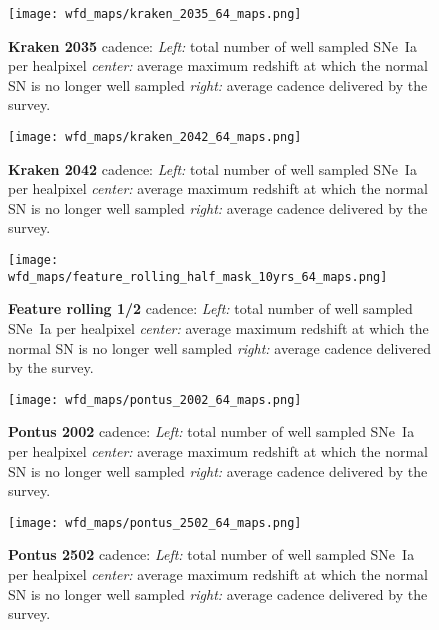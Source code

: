 \begin{figure}[!htbp]
  \begin{center}
    \texttt{[image: wfd\_maps/kraken\_2035\_64\_maps.png]}
    \caption{{\bf Kraken 2035} cadence: {\em Left:} total number of well
      sampled SNe~Ia per healpixel {\em center:} average maximum
      redshift at which the normal SN is no longer well sampled {\em
        right:} average cadence delivered by the survey.}
  \end{center}
  \label{fig:kraken_2035}
\end{figure}

\begin{figure}[!htbp]
  \begin{center}
    \texttt{[image: wfd\_maps/kraken\_2042\_64\_maps.png]}
    \caption{{\bf Kraken 2042} cadence: {\em Left:} total number of well
      sampled SNe~Ia per healpixel {\em center:} average maximum
      redshift at which the normal SN is no longer well sampled {\em
        right:} average cadence delivered by the survey.}
    \label{fig:kraken_2042}
  \end{center}
\end{figure}

\begin{figure}[!htbp]
  \begin{center}
    \texttt{[image: wfd\_maps/feature\_rolling\_half\_mask\_10yrs\_64\_maps.png]}
    \caption{{\bf Feature rolling 1/2} cadence: {\em Left:} total number of well
      sampled SNe~Ia per healpixel {\em center:} average maximum
      redshift at which the normal SN is no longer well sampled {\em
        right:} average cadence delivered by the survey.}
    \label{fig:feature_rolling_half_mask}
  \end{center}
\end{figure}


\begin{figure}[!htbp]
  \begin{center}
    \texttt{[image: wfd\_maps/pontus\_2002\_64\_maps.png]}
    \caption{{\bf Pontus 2002} cadence: {\em Left:} total number of well
      sampled SNe~Ia per healpixel {\em center:} average maximum
      redshift at which the normal SN is no longer well sampled {\em
        right:} average cadence delivered by the survey.}
    \label{fig:pontus_2002}
  \end{center}
\end{figure}

\begin{figure}[!htbp]
  \begin{center}
    \texttt{[image: wfd\_maps/pontus\_2502\_64\_maps.png]}
    \caption{{\bf Pontus 2502} cadence: {\em Left:} total number of well
      sampled SNe~Ia per healpixel {\em center:} average maximum
      redshift at which the normal SN is no longer well sampled {\em
        right:} average cadence delivered by the survey.}
    \label{fig:pontus_2502}
  \end{center}
\end{figure}

